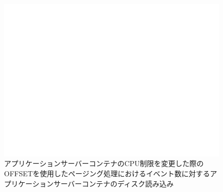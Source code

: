 \documentclass[../../../../../main]{subfiles}
\begin{document}
    \begin{figure}[H]
        \centering
        \includegraphics[width=12cm]{graph}
        \caption{アプリケーションサーバーコンテナのCPU制限を変更した際のOFFSETを使用したページング処理におけるイベント数に対するアプリケーションサーバーコンテナのディスク読み込み}
        \label{fig:paging-offset-change-app-cpu-limit-app-disk-out-app_1024-db_1_1024}
    \end{figure}
\end{document}
